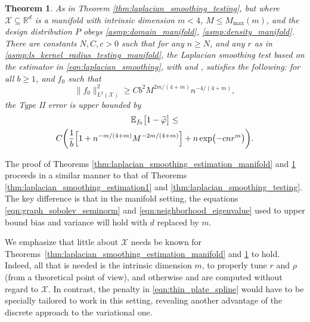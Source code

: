 \documentclass[twoside]{article}
\newcommand{\Reals}{\mathbb{R}}
\newcommand{\1}{\mathbf{1}}
\newcommand{\Rd}{\Reals^d}
\newcommand{\Xset}{\mathcal{X}}
\newcommand{\Leb}{L}
\newcommand{\Ebb}{\mathbb{E}}
\newcommand{\wh}[1]{\widehat{#1}}
\newtheorem{theorem}{Theorem}
\theoremstyle{definition}
\theoremstyle{remark}
\begin{document}
\begin{theorem}
	\label{thm:laplacian_smoothing_testing_manifold}
  As in Theorem \ref{thm:laplacian_smoothing_testing}, but where $\Xset \subseteq \Rd$ is a manifold with intrinsic dimension $m < 4$, $M \leq M_{\max}(m)$, and the design distribution $P$ obeys \ref{asmp:domain_manifold}, \ref{asmp:density_manifold}.
There are constants $N,C,c>0$ such that for any $n \geq N$, and any $r$ as in \ref{asmp:ls_kernel_radius_testing_manifold}, the Laplacian smoothing test \smash{$\wh{\varphi}$} based on the estimator \smash{$\wh{f}$} in \eqref{eqn:laplacian_smoothing}, with  and , satisfies the following: for all $b \geq 1$, and $f_0$ such that
	\begin{equation}
	\label{eqn:laplacian_smoothing_testing_manifold}
	\bigl\|f_0\bigr\|_{\Leb^2(\Xset)}^2 \geq C b^2 M^{2m/(4 + m)} n^{-4/(4 + m)},
	\end{equation} 
	the Type II error is upper bounded by
	\begin{multline*}
	\Ebb_{f_0}\bigl[1 - \wh{\varphi} \bigr] \leq \\
	C\biggl(\frac{1}{b}\Bigl[1 + n^{-m/(4 + m)}M^{-2m/(4 + m)}\Bigr] + n\exp\bigl(-cnr^m\bigr)\biggr).
	\end{multline*}
\end{theorem}

The proof of Theorems \ref{thm:laplacian_smoothing_estimation_manifold} and \ref{thm:laplacian_smoothing_testing_manifold} proceeds in a similar manner to that of Theorems \ref{thm:laplacian_smoothing_estimation1} and \ref{thm:laplacian_smoothing_testing}. The key difference is that in the manifold setting, the equations \eqref{eqn:graph_sobolev_seminorm} and \eqref{eqn:neighborhood_eigenvalue} used to upper bound bias and variance will hold with $d$ replaced by $m$.

We emphasize that little about $\Xset$ needs be known for Theorems~\ref{thm:laplacian_smoothing_estimation_manifold} and \ref{thm:laplacian_smoothing_testing_manifold} to hold. Indeed, all that is needed is the intrinsic dimension $m$, to properly tune $r$ and $\rho$ (from a theoretical point of view), and otherwise \smash{$\wh{f}$} and \smash{$\wh{\varphi}$} are computed without regard to $\Xset$. In contrast, the penalty in \eqref{eqn:thin_plate_spline} would have to be specially tailored to work in this setting, revealing another advantage of the discrete approach to the variational one.
\end{document}
